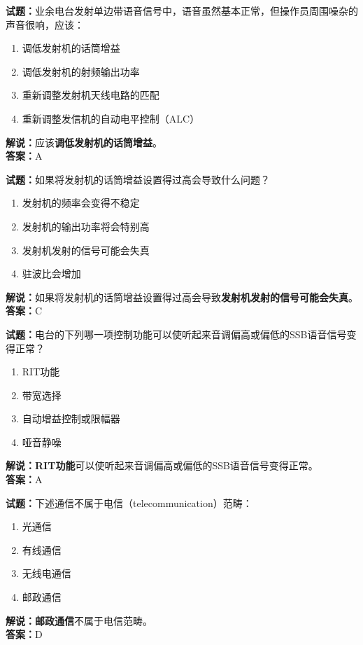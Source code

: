 \documentclass{ctexbook}
\begin{document}
\noindent\textbf{试题：}业余电台发射单边带语音信号中，语音虽然基本正常，但操作员周围噪杂的声音很响，应该：
\begin{enumerate}[leftmargin=3em]
\item 调低发射机的话筒增益
\item 调低发射机的射频输出功率
\item 重新调整发射机天线电路的匹配
\item 重新调整发信机的自动电平控制（ALC）
\end{enumerate}
\noindent\textbf{解说：}应该\textbf{调低发射机的话筒增益}。\\\noindent\textbf{答案：}A




\bigskip


\noindent\textbf{试题：}如果将发射机的话筒增益设置得过高会导致什么问题？
\begin{enumerate}[leftmargin=3em]
\item 发射机的频率会变得不稳定
\item 发射机的输出功率将会特别高
\item 发射机发射的信号可能会失真
\item 驻波比会增加
\end{enumerate}
\noindent\textbf{解说：}如果将发射机的话筒增益设置得过高会导致\textbf{发射机发射的信号可能会失真}。\\\noindent\textbf{答案：}C



\bigskip


\noindent\textbf{试题：}电台的下列哪一项控制功能可以使听起来音调偏高或偏低的SSB语音信号变得正常？
\begin{enumerate}[leftmargin=3em]
\item RIT功能
\item 带宽选择
\item 自动增益控制或限幅器
\item 哑音静噪
\end{enumerate}
\noindent\textbf{解说：}\textbf{RIT功能}可以使听起来音调偏高或偏低的SSB语音信号变得正常。\\\noindent\textbf{答案：}A




\bigskip


\noindent\textbf{试题：}下述通信不属于电信（telecommunication）范畴：
\begin{enumerate}[leftmargin=3em]
\item 光通信
\item 有线通信
\item 无线电通信
\item 邮政通信
\end{enumerate}
\noindent\textbf{解说：}\textbf{邮政通信}不属于电信范畴。\\\noindent\textbf{答案：}D
\end{document}
